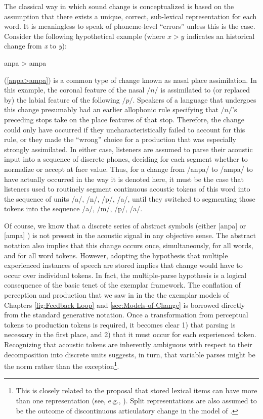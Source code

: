 The classical way in which sound change is conceptualized is based
on the assumption that there exists a unique, correct, sub-lexical
representation for each word. It is meaningless to speak of phoneme-level
“errors” unless this is the case. Consider the following hypothetical
example (where \emph{$x>y$} indicates an historical change from \emph{x}
to \emph{y}):
\begin{covexamples}
\item \label{anpa>ampa}{anpa \textgreater{} ampa}
\end{covexamples}
(\ref{anpa>ampa}) is a common type of change known as nasal place
assimilation. In this example, the coronal feature of the nasal $/n/$
is assimilated to (or replaced by) the labial feature of the following
$/p/$. Speakers of a language that undergoes this change presumably
had an earlier allophonic rule specifying that $/n/$'s preceding
stops take on the place features of that stop. Therefore, the change
could only have occurred if they uncharacteristically failed to account
for this rule, or they made the “wrong” choice for a production
that was especially strongly assimilated. In either case, listeners
are assumed to parse their acoustic input into a sequence of discrete
phones, deciding for each segment whether to normalize or accept at
face value. Thus, for a change from {/anpa/} to {/ampa/}
to have actually occurred in the way it is denoted here, it must be
the case that listeners used to routinely segment continuous acoustic
tokens of this word into the sequence of units {/a/}, {/n/},
{/p/}, {/a/}, until they switched to segmenting
those tokens into the sequence {/a/}, {/m/}, {/p/},
{/a/}. 

Of course, we know that a discrete series of abstract symbols (either
{[anpa]} or {[ampa]} ) is not present in the acoustic
signal in any objective sense. The abstract notation also implies
that this change occurs once, simultaneously, for all words, and for
all word tokens. However, adopting the hypothesis that multiple experienced
instances of speech are stored implies that change would have to occur
over individual tokens. In fact, the multiple-parse hypothesis is
a logical consequence of the basic tenet of the exemplar framework.
The conflation of perception and production that we saw in in the
the exemplar models of Chapters \ref{fig:Feedback Loop} and \ref{sec:Models-of-Change}
is borrowed directly from the standard generative notation. Once a
transformation from perceptual tokens to production tokens is required,
it becomes clear 1) that parsing is necessary in the first place,
and 2) that it must occur for each experienced token. Recognizing
that acoustic tokens are inherently ambiguous with respect to their
decomposition into discrete units suggests, in turn, that variable
parses might be the norm rather than the exception\footnote{This is closely related to the proposal that stored lexical items
can have more than one representation (see, e.g., \citealp{hooper1976word,Janda2008,Bybee2001}).
Split representations are also assumed to be the outcome of discontinuous
articulatory change in the model of \citet{Garrett2013}.}. 


